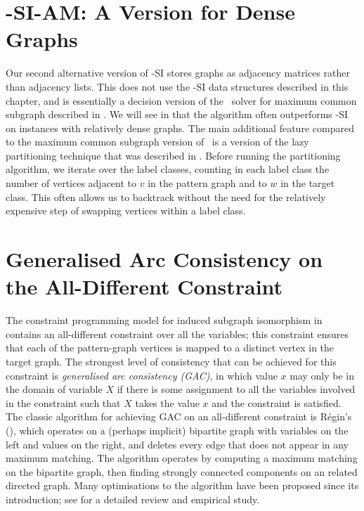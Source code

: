 \section{\McSplit-SI-AM: A Version for Dense Graphs}\label{sec:mcsplit-si-adjmat}

Our second alternative version of \McSplit-SI 
stores graphs as adjacency matrices rather than
adjacency lists.  This does not use the \McSplit-SI data structures described
in this chapter, and is essentially a decision version of the \McSplit\ solver
for maximum common subgraph described in .
We will see in 
that the algorithm often outperforms \McSplit-SI on instances with
relatively dense graphs.  The main additional feature compared to the maximum
common subgraph version of \McSplit\ is a version of the lazy partitioning
technique that was described in .  Before
running the partitioning algorithm, we iterate over the label classes, counting
in each label class the number of vertices adjacent to $v$ in the pattern graph
and to $w$ in the target class.  This often allows us to backtrack without the
need for the relatively expensive step of swapping vertices within a label
class.

\section{Generalised Arc Consistency on the All-Different Constraint}\label{sec:mcsplit-si-gac}

The constraint programming model for induced subgraph isomorphism in 
contains an all-different
constraint over all the variables; this constraint ensures that each of the pattern-graph vertices
is mapped to a distinct vertex in the target graph.  The strongest level of consistency that can
be achieved for this constraint is \emph{generalised arc consistency (GAC)}, in which value
$x$ may only be in the domain of variable $X$ if there is some assignment to all
the variables involved in the constraint such that $X$ takes the value $x$
and the constraint is satisfied.
The classic algorithm for achieving GAC on an all-different constraint is R\'egin's
(\citeyear{DBLP:conf/aaai/Regin94}), which operates
on a (perhaps implicit) bipartite graph with variables on the left and values on the right, and 
deletes every edge that does not appear in any maximum matching.  The algorithm operates by computing
a maximum matching on the bipartite graph, then finding strongly connected components on an related directed
graph.  Many optimisations to the algorithm have been proposed since its introduction; see
\citet{DBLP:journals/ai/GentMN08} for a detailed review and empirical study.

